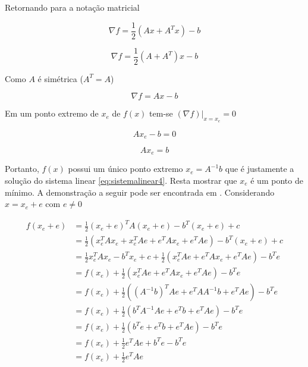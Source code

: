 Retornando para a notação matricial


\begin{equation}
    \nabla f = \frac{1}{2} (Ax + A^T x) - b
\end{equation}


\begin{equation}
    \nabla f = \frac{1}{2} (A + A^T) x - b
\end{equation}

Como $A$ é simétrica ($A^T = A$)

\begin{equation} \label{eq:gradf}
    \nabla f = A x - b
\end{equation}

Em um ponto extremo de  $ x_e$ de $f(x)$ tem-se $(\nabla f)|_{x=x_e} = 0 $

\begin{equation}
    Ax_e - b = 0
\end{equation}

\begin{equation}
    Ax_e = b
\end{equation}

Portanto, $f(x)$ possui um único ponto extremo $x_e = A^{-1}b$ que é justamente a solução do sistema linear \eqref{eq:sistemalinear4}. Resta mostrar que $x_e$ é um ponto de mínimo. A demonstração a seguir pode ser encontrada em \citet{Shewchuk94anintroduction}. Considerando $x = x_e + e$ com $e \neq 0 $


\begin{align}
     f(x_e + e) & =  \frac{1}{2} (x_e + e)^T A (x_e + e) - b^T(x_e + e) + c  \nonumber\\
                & =  \frac{1}{2} (x_e^TAx_e + x_e^TAe + e^TAx_e + e^TAe )- b^T(x_e + e) + c  \nonumber\\
                & =  \frac{1}{2} x_e^TAx_e -b^Tx_e + c + \frac{1}{2} ( x_e^TAe + e^TAx_e + e^TAe ) - b^Te  \nonumber\\
                & =  f(x_e) + \frac{1}{2} ( x_e^TAe + e^TAx_e + e^TAe ) - b^Te  \nonumber\\
                & =  f(x_e) + \frac{1}{2} ( (A^{-1}b)^TAe + e^TAA^{-1}b + e^TAe ) - b^Te  \nonumber\\
                & =  f(x_e) + \frac{1}{2} ( b^TA^{-1}Ae + e^Tb + e^TAe ) - b^Te  \nonumber\\
                & =  f(x_e) + \frac{1}{2} ( b^Te + e^Tb + e^TAe ) - b^Te  \nonumber\\
                & =  f(x_e) + \frac{1}{2}  e^TAe  + b^Te - b^Te  \nonumber\\
                & =  f(x_e) + \frac{1}{2}  e^TAe \nonumber
\end{align}



